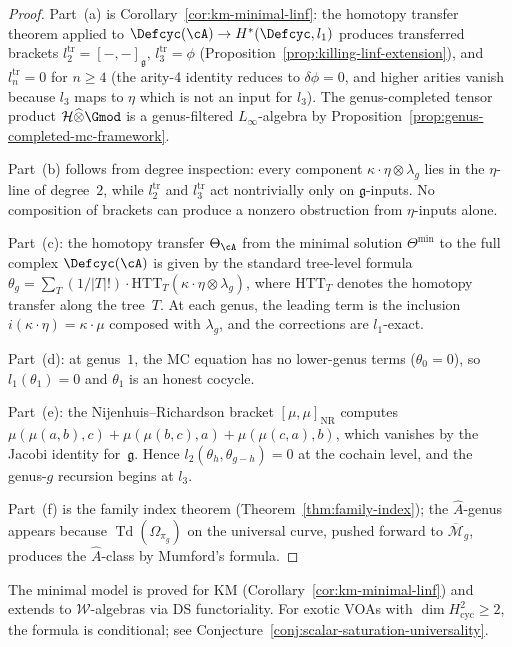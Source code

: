 \begin{proof}
Part~(a) is Corollary~\ref{cor:km-minimal-linf}: the homotopy
transfer theorem applied to $\Defcyc(\cA) \to H^*(\Defcyc, l_1)$
produces transferred brackets
$l_2^{\mathrm{tr}} = [-,-]_{\mathfrak{g}}$,
$l_3^{\mathrm{tr}} = \phi$
(Proposition~\ref{prop:killing-linf-extension}), and
$l_n^{\mathrm{tr}} = 0$ for $n \geq 4$ (the arity-4 identity
reduces to $\delta\phi = 0$, and higher arities vanish because
$l_3$ maps to $\eta$ which is not an input for $l_3$).
The genus-completed tensor product
$\mathcal{H} \widehat{\otimes} \Gmod$ is a genus-filtered
$L_\infty$-algebra by
Proposition~\ref{prop:genus-completed-mc-framework}.

Part~(b) follows from degree inspection: every component
$\kappa \cdot \eta \otimes \lambda_g$ lies in the
$\eta$-line of degree~$2$, while $l_2^{\mathrm{tr}}$ and
$l_3^{\mathrm{tr}}$ act nontrivially only on $\mathfrak{g}$-inputs.
No composition of brackets can produce a nonzero
obstruction from $\eta$-inputs alone.

Part~(c): the homotopy transfer $\Theta_{\cA}$ from the minimal
solution $\Theta^{\min}$ to the full complex $\Defcyc(\cA)$ is
given by the standard tree-level formula
$\theta_g = \sum_T (1/|T|!) \cdot
\mathrm{HTT}_T(\kappa \cdot \eta \otimes \lambda_g)$,
where $\mathrm{HTT}_T$ denotes the homotopy transfer along the
tree~$T$.  At each genus, the leading term is the
inclusion $i(\kappa \cdot \eta) = \kappa \cdot \mu$ composed with
$\lambda_g$, and the corrections are $l_1$-exact.

Part~(d): at genus~$1$, the MC equation has no lower-genus terms
($\theta_0 = 0$), so $l_1(\theta_1) = 0$ and $\theta_1$ is an
honest cocycle.

Part~(e): the Nijenhuis--Richardson bracket
$[\mu,\mu]_{\mathrm{NR}}$ computes
$\mu(\mu(a,b),c) + \mu(\mu(b,c),a) + \mu(\mu(c,a),b)$,
which vanishes by the Jacobi identity for~$\mathfrak{g}$.
Hence $l_2(\theta_h, \theta_{g-h}) = 0$ at the cochain level,
and the genus-$g$ recursion begins at $l_3$.

Part~(f) is the family index theorem
(Theorem~\ref{thm:family-index}); the $\hat{A}$-genus appears
because
$\operatorname{Td}(\Omega_{\pi_g})$ on the universal curve,
pushed forward to $\overline{\mathcal{M}}_g$, produces the
$\hat{A}$-class by Mumford's formula.
\end{proof}

\begin{remark}
\label{rem:explicit-theta-scope}
The minimal model is proved for KM
(Corollary~\ref{cor:km-minimal-linf}) and extends to
$\mathcal{W}$-algebras via DS functoriality.  For exotic VOAs
with $\dim H^2_{\mathrm{cyc}}\geq 2$, the formula is conditional;
see Conjecture~\ref{conj:scalar-saturation-universality}.
\end{remark}

